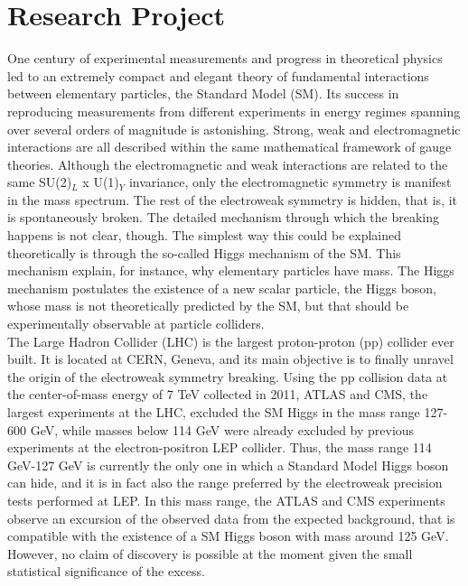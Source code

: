 \documentclass[10pt, a4paper]{article}
\begin{document}
\section*{Research Project}

One century of experimental measurements and progress in theoretical physics 
led to an extremely compact and elegant theory of fundamental interactions between 
elementary particles, the Standard Model (SM). Its success in reproducing 
measurements from different experiments in energy regimes spanning 
over several orders of magnitude is astonishing. 
Strong, weak and electromagnetic interactions are all described within the 
same mathematical framework of gauge theories. Although the electromagnetic and weak 
interactions are related to the same SU(2)$_L$ x U(1)$_Y$ invariance, only 
the electromagnetic symmetry is manifest in the mass spectrum. 
The rest of the electroweak symmetry is hidden, that is, it is spontaneously broken. 
The detailed mechanism through which the breaking happens is not clear, though. 
The simplest way this could be explained theoretically is through the 
so-called Higgs mechanism of the SM. This mechanism explain, for instance, why 
elementary particles have mass. The Higgs mechanism postulates the existence 
of a new scalar particle, the Higgs boson, whose mass is not theoretically predicted by 
the SM, but that should be experimentally observable at particle colliders. \\

The Large Hadron Collider (LHC) is the largest proton-proton (pp) collider ever built. 
It is located at CERN, Geneva, and its main objective is to finally unravel the origin 
of the electroweak symmetry breaking. Using the pp collision data at the center-of-mass energy
of 7 TeV collected in 2011, ATLAS and CMS, the 
largest experiments at the LHC, excluded the SM Higgs in the mass range 
127-600 GeV, while masses below 114 GeV were already excluded by 
previous experiments at the electron-positron LEP collider. 
Thus, the mass range 114 GeV-127 GeV is currently the only one in which 
a Standard Model Higgs boson can hide, and it is in fact also the range 
preferred by the electroweak precision tests performed at LEP. 
In this mass range, the ATLAS and CMS experiments observe an excursion of 
the observed data from the expected background, that is compatible with the existence 
of a SM Higgs boson with mass around 125 GeV. However, no claim of 
discovery is possible at the moment given the small statistical significance of the excess. 
\end{document}
